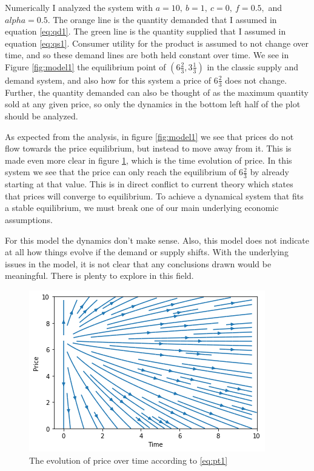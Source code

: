 \documentclass{article}
\begin{document}
Numerically I analyzed the system with $a = 10,\ b = 1,\ c = 0,\ f = 0.5,$ and $alpha = 0.5$. The orange line is the quantity demanded that I assumed in equation \eqref{eq:qd1}. The green line is the quantity supplied that I assumed in equation \eqref{eq:qs1}. Consumer utility for the product is assumed to not change over time, and so these demand lines are both held constant over time. We see in Figure \ref{fig:model1} the equilibrium point of $(6 \frac{2}{3}, 3 \frac{1}{3})$ in the classic supply and demand system, and also how for this system a price of $6 \frac{2}{3}$ does not change. Further, the quantity demanded can also be thought of as the maximum quantity sold at any given price, so only the dynamics in the bottom left half of the plot should be analyzed.

As expected from the analysis, in figure \ref{fig:model1} we see that prices do not flow towards the price equilibrium, but instead to move away from it. This is made even more clear in figure \ref{fig:model1_time_price}, which is the time evolution of price. In this system we see that the price can only reach the equilibrium of $6 \frac{2}{3}$ by already starting at that value. This is in direct conflict to current theory which states that prices will converge to equilibrium. To achieve a dynamical system that fits a stable equilibrium, we must break one of our main underlying economic assumptions.

For this model the dynamics don't make sense. Also, this model does not indicate at all how things evolve if the demand or supply shifts. With the underlying issues in the model, it is not clear that any conclusions drawn would be meaningful. There is plenty to explore in this field.

	\begin{figure}
		\centering
			\includegraphics[width = 0.6\columnwidth]{Figures/simple_priceOverTime.png}
		\caption{The evolution of price over time according to \eqref{eq:pt1}}
		\label{fig:model1_time_price} 
	\end{figure}
\end{document}
